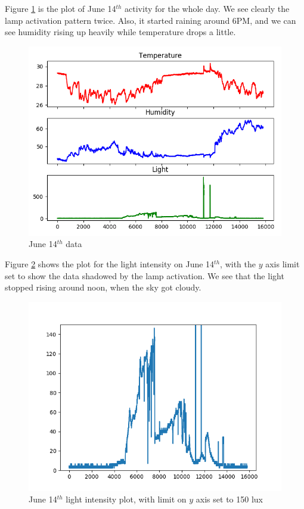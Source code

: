 \documentclass[11pt]{article}
\begin{document}
Figure \ref{fig:june14} is the plot of June 14$^{th}$ activity for the whole day. We see clearly the lamp activation pattern twice. Also, it started raining around 6PM, and we can see humidity rising up heavily while temperature drops a little.

\begin{figure}[h]
\includegraphics[width=\textwidth]{log-20170514}
\caption{June 14$^{th}$ data}
\label{fig:june14}
\end{figure}

Figure \ref{fig:june14light} shows the plot for the light intensity on June 14$^{th}$, with the $y$ axis limit set to show the data shadowed by the lamp activation. We see that the light stopped rising around noon, when the sky got cloudy. 

\begin{figure}[h]
\includegraphics[width=\textwidth]{log-20170514-light}
\caption{June 14$^{th}$ light intensity plot, with limit on $y$ axis set to 150 lux}
\label{fig:june14light}
\end{figure}
\end{document}
